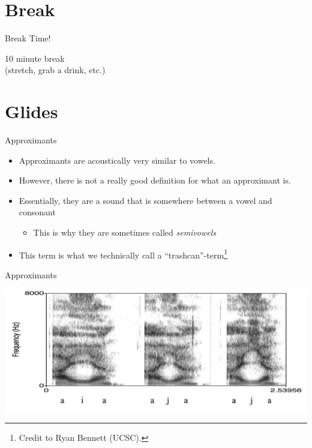 \documentclass[professionalfonts]{beamer}
\begin{document}
\section*{Break}

\begin{frame}{Break Time!}
    \begin{center}
        \Huge 10 minute break \\ (stretch, grab a drink, etc.)
    \end{center}
\end{frame}

\section*{Glides}

\begin{frame}{Approximants}
    \begin{itemize}
        \item Approximants are acoustically very similar to vowels. 
        \item However, there is not a really good definition for what an approximant is. 
        \item Essentially, they are a sound that is somewhere between a vowel and consonant 
        \begin{itemize}
            \item This is why they are sometimes called \textit{semivowels}
        \end{itemize}
        \item This term is what we technically call a ``trashcan''-term\footnote{Credit to Ryan Bennett (UCSC).}
    \end{itemize}
\end{frame}

\begin{frame}{Approximants}
    \begin{center}
        \includegraphics[width = \textwidth]{figs/padgett-2008.jpg}
    \end{center}
\end{frame}
\end{document}
